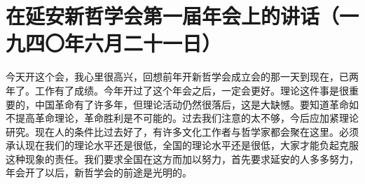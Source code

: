 \section[在延安新哲学会第一届年会上的讲话（一九四〇年六月二十一日）]{在延安新哲学会第一届年会上的讲话（一九四〇年六月二十一日）}


今天开这个会，我心里很高兴，回想前年开新哲学会成立会的那一天到现在，已两年了。工作有了成绩。今年开过了这个年会之后，一定会更好。理论这件事是很重要的，中国革命有了许多年，但理论活动仍然很落后，这是大缺憾。要知道革命如不提高革命理论，革命胜利是不可能的。过去我们注意的太不够，今后应加紧理论研究。现在人的条件比过去好了，有许多文化工作者与哲学家都会聚在这里。必须承认现在我们的理论水平还是很低，全国的理论水平还是很低，大家才能负起克服这种现象的责任。我们要求全国在这方而加以努力，首先要求延安的人多多努力，年会开了以后，新哲学会的前途是光明的。


